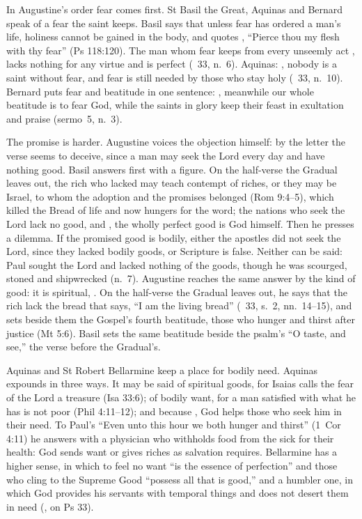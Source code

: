In Augustine's order fear comes first. St Basil the Great, Aquinas and Bernard
speak of a fear the saint keeps. Basil says that unless fear has ordered a man's
life, holiness cannot be gained in the body, and quotes , ``Pierce thou my flesh with thy fear'' (Ps 118:120). The man
whom fear keeps from every unseemly act , lacks nothing for any virtue and is perfect
(\ 33, n.~6). Aquinas: , nobody is a saint without fear, and fear is still needed
by those who stay holy (\ 33, n.~10). Bernard
puts fear and beatitude in one sentence: , meanwhile our whole beatitude is to fear God, while the
saints in glory keep their feast in exultation and praise (sermo~5, n.~3).

The promise is harder. Augustine voices the objection himself: by the letter
the verse seems to deceive, since a man may seek the Lord every day and have
nothing good. Basil answers first with a figure. On the half-verse the
Gradual leaves out, the rich who lacked may teach contempt of riches, or they
may be Israel, to whom the adoption and the promises belonged (Rom 9:4--5),
which killed the Bread of life and now hungers for the word; the nations who
seek the Lord lack no good, and ,
the wholly perfect good is God himself. Then he presses a dilemma. If the
promised good is bodily, either the apostles did not seek the Lord, since they
lacked bodily goods, or Scripture is false. Neither can be said: Paul sought
the Lord and lacked nothing of the goods, though he was scourged, stoned and
shipwrecked (n.~7). Augustine reaches the same answer by the kind of good: it
is spiritual, . On the half-verse the Gradual
leaves out, he says that the rich lack the bread that says, ``I am the living
bread'' (\ 33, s.~2, nn.~14--15), and sets beside them
the Gospel's fourth beatitude, those who hunger and thirst after justice
(Mt 5:6). Basil sets the same beatitude beside the psalm's ``O taste, and
see,'' the verse before the Gradual's.

Aquinas and St Robert Bellarmine keep a place for bodily need. Aquinas
expounds  in three ways. It may be said of spiritual
goods, for Isaias calls the fear of the Lord a treasure (Isa 33:6); of bodily
want, for a man satisfied with what he has is not poor (Phil 4:11--12); and because , God helps those who seek him in
their need. To Paul's ``Even unto this hour we both hunger and thirst''
(1~Cor 4:11) he answers with a physician who withholds food from the sick for
their health: God sends want or gives riches as salvation requires.
Bellarmine has a higher sense, in which to feel no want ``is the essence of
perfection'' and those who cling to the Supreme Good ``possess all that is
good,'' and a humbler one, in which God provides his servants with temporal
things and does not desert them in need (, on
Ps 33).

